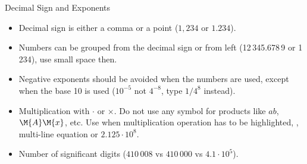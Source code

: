 \documentclass[xcolor=dvipsnames, aspectratio=169, handout, intlimits]{beamer}
\begin{document}
\begin{frame}{Decimal Sign and Exponents}

\begin{itemize}
	\item Decimal sign is either a comma or a point ($1,234$ or $1.234$).
	\item<2-> Numbers can be grouped from the decimal sign or from left (12\,345.678\,9 or 1\,234), use small space then.
	\item<3-> Negative exponents should be avoided when the numbers are used, except when the base 10 is used ($10^{-5}$ not $4^{-8}$, type $1/4^8$ instead).
	\item<4-> Multiplication with $\cdot$ or $\times$. Do not use any symbol for products like $ab$, $\M{A}\M{x}$, etc. Use when multiplication operation has to be highlighted, \ie{}, multi-line equation or $2.125 \cdot 10^8$.
	\item<5-> Number of significant digits ($410\,008$ vs $410\,000$ vs $4.1\cdot 10^5$).
\end{itemize}

\vspace{0.25cm}

\end{frame}
\end{document}
